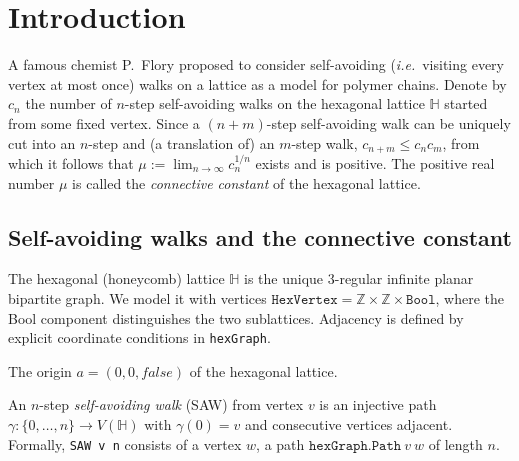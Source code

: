 %

\chapter{Introduction}\label{chap:intro}

A famous chemist P.~Flory proposed to consider self-avoiding (\emph{i.e.}\ visiting
every vertex at most once) walks on a lattice as a model for polymer chains.
Denote by $c_n$ the number of $n$-step self-avoiding walks on the hexagonal lattice
$\mathbb{H}$ started from some fixed vertex. Since a $(n{+}m)$-step self-avoiding
walk can be uniquely cut into an $n$-step and (a translation of) an $m$-step walk,
$c_{n+m} \leq c_n c_m$, from which it follows that
$\mu := \lim_{n \to \infty} c_n^{1/n}$ exists and is positive.
The positive real number $\mu$ is called the \emph{connective constant} of the
hexagonal lattice.

\section{Self-avoiding walks and the connective constant}

\begin{definition}\label{def:hex_lattice}
\leanok
  The hexagonal (honeycomb) lattice $\mathbb{H}$ is the unique $3$-regular infinite
  planar bipartite graph. We model it with vertices
  $\texttt{HexVertex} = \mathbb{Z} \times \mathbb{Z} \times \texttt{Bool}$,
  where the Bool component distinguishes the two sublattices.
  Adjacency is defined by explicit coordinate conditions in \texttt{hexGraph}.
\end{definition}

\begin{definition}\label{def:hex_origin}
\leanok
{}
  The origin $a = (0, 0, \mathit{false})$ of the hexagonal lattice.
\end{definition}

\begin{definition}\label{def:saw}
\leanok
{}
  An $n$-step \emph{self-avoiding walk} (SAW) from vertex $v$ is an injective
  path $\gamma : \{0,\ldots,n\} \to V(\mathbb{H})$ with $\gamma(0) = v$ and
  consecutive vertices adjacent. Formally, \texttt{SAW v n} consists of a
  vertex $w$, a path $\texttt{hexGraph.Path}~v~w$ of length $n$.
\end{definition}

